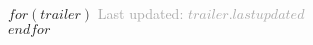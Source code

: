 \documentclass[$fontsize$, a4paper]{article}
\begin{document}
\vspace*{\fill}
$for(trailer)$
  \footnotesize{\textcolor{darkgray}{Last updated: $trailer.lastupdated$}}\\
$endfor$
\end{document}
